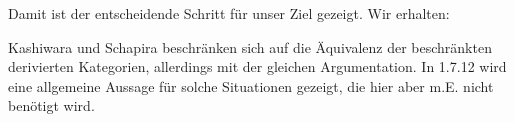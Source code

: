 Damit ist der entscheidende Schritt für unser Ziel gezeigt. Wir
erhalten:






\begin{bem}
  Kashiwara und Schapira beschränken sich auf die Äquivalenz der
  beschränkten derivierten Kategorien, allerdings mit der gleichen
  Argumentation. In \cite{KS} 1.7.12 wird eine allgemeine Aussage für
  solche Situationen gezeigt, die hier aber m.E. nicht benötigt wird.
\end{bem}

